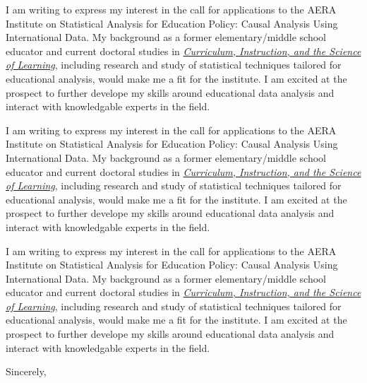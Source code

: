 \documentclass[11pt]{letter}\usepackage[]{graphicx}\usepackage[]{color}
\begin{document}
\begin{letter}
I am writing to express my interest in the call for applications to the AERA Institute on Statistical Analysis for Education Policy: Causal Analysis Using International Data.  My background as a former elementary/middle school educator and current doctoral studies in \href{http://gse.buffalo.edu/programs/cisl}{\emph{Curriculum, Instruction, and the Science of Learning}}, including research and study of statistical techniques tailored for educational analysis, would make me a fit for the institute.  I am excited at the prospect to further develope my skills around educational data analysis and interact with knowledgable experts in the field.

I am writing to express my interest in the call for applications to the AERA Institute on Statistical Analysis for Education Policy: Causal Analysis Using International Data.  My background as a former elementary/middle school educator and current doctoral studies in \href{http://gse.buffalo.edu/programs/cisl}{\emph{Curriculum, Instruction, and the Science of Learning}}, including research and study of statistical techniques tailored for educational analysis, would make me a fit for the institute.  I am excited at the prospect to further develope my skills around educational data analysis and interact with knowledgable experts in the field.

I am writing to express my interest in the call for applications to the AERA Institute on Statistical Analysis for Education Policy: Causal Analysis Using International Data.  My background as a former elementary/middle school educator and current doctoral studies in \href{http://gse.buffalo.edu/programs/cisl}{\emph{Curriculum, Instruction, and the Science of Learning}}, including research and study of statistical techniques tailored for educational analysis, would make me a fit for the institute.  I am excited at the prospect to further develope my skills around educational data analysis and interact with knowledgable experts in the field.



\closing{Sincerely,}




\end{letter}
\end{document}

